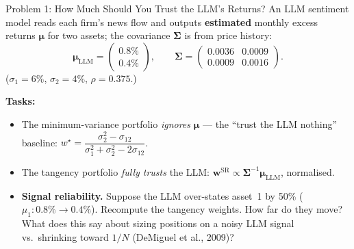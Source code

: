 \documentclass[9pt,t]{beamer}
\begin{document}
\begin{frame}{Problem 1: How Much Should You Trust the LLM's Returns?}
An LLM sentiment model reads each firm's news flow and outputs \textbf{estimated} monthly
excess returns $\boldsymbol{\mu}$ for two assets; the covariance $\boldsymbol{\Sigma}$ is
from price history:
\[
\boldsymbol{\mu}_{\text{LLM}}=\begin{pmatrix}0.8\%\\0.4\%\end{pmatrix},\qquad
\boldsymbol{\Sigma}=\begin{pmatrix}0.0036 & 0.0009\\ 0.0009 & 0.0016\end{pmatrix}.
\]
($\sigma_1=6\%$, $\sigma_2=4\%$, $\rho=0.375$.)

\medskip
\textbf{Tasks:}
\begin{itemize}
  \item[\textbf{A.}] The minimum-variance portfolio \emph{ignores} $\boldsymbol{\mu}$ ---
        the ``trust the LLM nothing'' baseline: $w^\star=\dfrac{\sigma_2^2-\sigma_{12}}{\sigma_1^2+\sigma_2^2-2\sigma_{12}}$.
  \item[\textbf{B.}] The tangency portfolio \emph{fully trusts} the LLM:
        $\mathbf{w}^{\text{SR}}\propto\boldsymbol{\Sigma}^{-1}\boldsymbol{\mu}_{\text{LLM}}$, normalised.
  \item[\textbf{C.}] \textbf{Signal reliability.} Suppose the LLM over-states asset~1 by 50\%
        ($\mu_1:0.8\%\to0.4\%$). Recompute the tangency weights. How far do they move? What does
        this say about sizing positions on a noisy LLM signal vs.\ shrinking toward $1/N$
        (DeMiguel et al., 2009)?
\end{itemize}
\end{frame}
\end{document}
